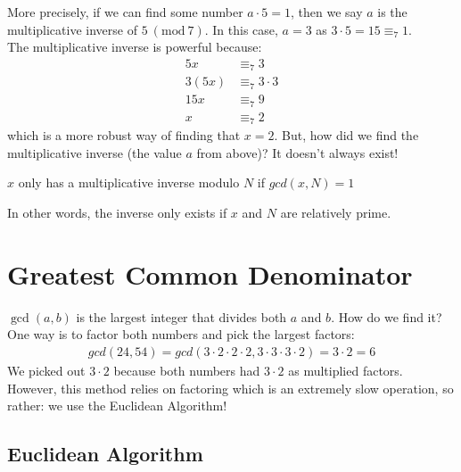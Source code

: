 \documentclass[14pt]{extarticle}
\newcommand{\Mod}[1]{\ (\mathrm{mod}\ #1)}
\begin{document}
    More precisely, if we can find some number $a\cdot 5 = 1$, then
    we say $a$ is the multiplicative inverse of $5\Mod{7}$. In this case,
    $a = 3$ as $3\cdot 5 = 15 \equiv_7 1$.\\

    The multiplicative inverse is powerful because:
    \begin{align*}
        5x &\equiv_7 3              \\
        3(5x)   &\equiv_7 3\cdot 3    \\
        15x     &\equiv_7 9           \\
        x       &\equiv_7 2     
    \end{align*}
    which is a more robust way of finding that $x = 2$. But, how did we 
    find the multiplicative inverse (the value $a$ from above)? It doesn't
    always exist!

    \begin{theorem*}
        $x$ only has a multiplicative inverse modulo $N$ if $gcd(x, N) = 1$
    \end{theorem*}
    In other words, the inverse only exists if $x$ and $N$ are relatively
    prime.

    \section{Greatest Common Denominator}
    $\gcd(a, b)$ is the largest integer that divides both $a$ and $b$. How do
    we find it?\\

    One way is to factor both numbers and pick the largest factors:
    \begin{align*}
        gcd(24, 54) = gcd(3\cdot 2\cdot 2\cdot 2, 3\cdot 3\cdot 3\cdot 2)
        = 3 \cdot 2 = 6
    \end{align*}
    We picked out $3\cdot 2$ because both numbers had $3\cdot 2$ as multiplied
    factors. However, this method relies on factoring which is an extremely
    slow operation, so rather: we use the Euclidean Algorithm!

    \subsection{Euclidean Algorithm}
    \begin{algorithm}[H]
        \Fn{\FMain{$x, y$}}{
            \If{$y = 0$}{
                \Return $x$
            }
            \Return \Call{\FMain{$x, x\Mod{y}$}}
        }
    \end{algorithm}
\end{document}
